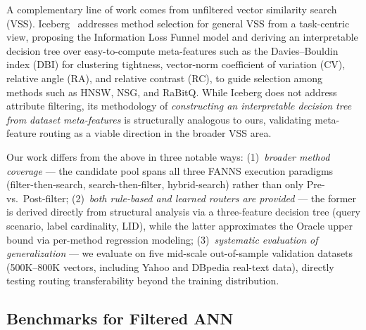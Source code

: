 A complementary line of work comes from unfiltered vector similarity search (VSS). Iceberg~\cite{Iceberg} addresses method selection for general VSS from a task-centric view, proposing the Information Loss Funnel model and deriving an interpretable decision tree over easy-to-compute meta-features such as the Davies--Bouldin index (DBI) for clustering tightness, vector-norm coefficient of variation (CV), relative angle (RA), and relative contrast (RC), to guide selection among methods such as HNSW, NSG, and RaBitQ. While Iceberg does not address attribute filtering, its methodology of \emph{constructing an interpretable decision tree from dataset meta-features} is structurally analogous to ours, validating meta-feature routing as a viable direction in the broader VSS area.

Our work differs from the above in three notable ways: (1)~\emph{broader method coverage} --- the candidate pool spans all three FANNS execution paradigms (filter-then-search, search-then-filter, hybrid-search) rather than only Pre- vs.\ Post-filter; (2)~\emph{both rule-based and learned routers are provided} --- the former is derived directly from structural analysis via a three-feature decision tree (query scenario, label cardinality, LID), while the latter approximates the Oracle upper bound via per-method regression modeling; (3)~\emph{systematic evaluation of generalization} --- we evaluate on five mid-scale out-of-sample validation datasets (500K--800K vectors, including Yahoo and DBpedia real-text data), directly testing routing transferability beyond the training distribution.

\subsection{Benchmarks for Filtered ANN}
\label{sec:rw-bench}

